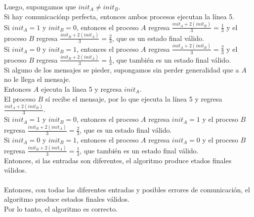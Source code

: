 \documentclass[12pt,a4paper]{report}
\begin{document}
\begin{enumerate}
{	Luego, supongamos que $init_A \ne init_B$.\\
	Si hay comunicaciónp perfecta, entonces ambos procesos ejecutan la línea 5.\\
	Si $init_A = 1$ y $init_B = 0$, entonces el proceso $A$ regresa
	$\frac{init_A + 2(init_B)}{3} = \frac{1}{3}$ y el proceso $B$ regresa
	$\frac{init_B + 2(init_A)}{3} = \frac{2}{3}$, que es un estado final válido.\\
	Si $init_A = 0$ y $init_B = 1$, entonces el proceso $A$ regresa
	$\frac{init_A + 2(init_B)}{3} = \frac{2}{3}$ y el proceso $B$ regresa
	$\frac{init_B + 2(init_A)}{3} = \frac{1}{3}$, que también es un estado final válido.\\
	Si alguno de los mensajes se pieder, supongamos sin perder generalidad que a $A$
	no le llega el mensaje.\\
	Entonces $A$ ejecuta la línea 5 y regresa $init_A$.\\
	El proceso $B$ sí recibe el mensaje, por lo que ejecuta la línea 5 y regresa
	$\frac{init_A + 2 (init_B)}{3}$.\\
	Si $init_A = 1$ y $init_B = 0$, entonces el proceso $A$ regresa $init_A = 1$
	y el proceso $B$ regresa $\frac{init_B + 2(init_A)}{3} = \frac{2}{3}$,
	que es un estado final válido.\\
	Si $init_A = 0$ y $init_B = 1$, entonces el proceso $A$ regresa $init_A = 0$
	y el proceso $B$ regresa $\frac{init_B + 2(init_A)}{3} = \frac{1}{3}$,
	que también es un estado final válido.\\
	Entonces, si las entradas son diferentes, el algoritmo produce etados finales
	válidos.\\\\
	Entonces, con todas las diferentes entradas y posibles errores de comunicación,
	el algoritmo produce estados finales válidos.\\
	Por lo tanto, el algoritmo es correcto.\\\\
	}
\end{enumerate}
\end{document}
